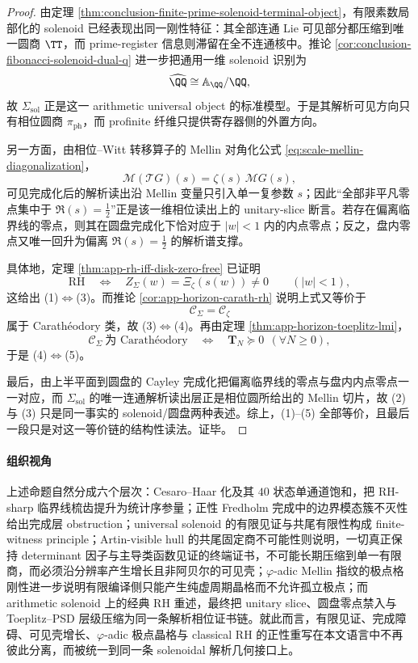 \begin{proof}
由定理 \ref{thm:conclusion-finite-prime-solenoid-terminal-object}，有限素数局部化的 solenoid 已经表现出同一刚性特征：其全部连通 Lie 可见部分都压缩到唯一圆商 \(\TT\)，而 prime-register 信息则滞留在全不连通核中。推论 \ref{cor:conclusion-fibonacci-solenoid-dual-q} 进一步把通用一维 solenoid 识别为
\[
\widehat{\QQ}\cong \mathbb A_{\QQ}/\QQ,
\]
故 \(\Sigma_{\mathrm{sol}}\) 正是这一 arithmetic universal object 的标准模型。于是其解析可见方向只有相位圆商 \(\pi_{\mathrm{ph}}\)，而 profinite 纤维只提供寄存器侧的外置方向。

另一方面，由相位--Witt 转移算子的 Mellin 对角化公式 \eqref{eq:scale-mellin-diagonalization}，
\[
\mathcal M(\mathcal T G)(s)=\zeta(s)\,\mathcal M G(s),
\]
可见完成化后的解析读出沿 Mellin 变量只引入单一复参数 \(s\)；因此“全部非平凡零点集中于 \(\Re(s)=\tfrac12\)”正是该一维相位读出上的 unitary-slice 断言。若存在偏离临界线的零点，则其在圆盘完成化下恰对应于 \(|w|<1\) 内的内点零点；反之，盘内零点又唯一回升为偏离 \(\Re(s)=\tfrac12\) 的解析谱支撑。

具体地，定理 \ref{thm:app-rh-iff-disk-zero-free} 已证明
\[
\mathrm{RH}
\quad\Longleftrightarrow\quad
Z_\Sigma(w)=\Xi_\zeta(s(w))\neq 0
\qquad (|w|<1),
\]
这给出 (1)\(\Leftrightarrow\)(3)。而推论 \ref{cor:app-horizon-carath-rh} 说明上式又等价于
\[
\mathscr C_\Sigma=\mathscr C_\zeta
\]
属于 Carath\'eodory 类，故 (3)\(\Leftrightarrow\)(4)。再由定理 \ref{thm:app-horizon-toeplitz-lmi}，
\[
\mathscr C_\Sigma\ \text{为 Carath\'eodory}
\quad\Longleftrightarrow\quad
\mathbf T_N\succeq 0\ \ (\forall N\ge 0),
\]
于是 (4)\(\Leftrightarrow\)(5)。

最后，由上半平面到圆盘的 Cayley 完成化把偏离临界线的零点与盘内内点零点一一对应，而 \(\Sigma_{\mathrm{sol}}\) 的唯一连通解析读出层正是相位圆所给出的 Mellin 切片，故 (2) 与 (3) 只是同一事实的 solenoid/圆盘两种表述。综上，(1)--(5) 全部等价，且最后一段只是对这一等价链的结构性读法。证毕。
\end{proof}






\paragraph{组织视角}
上述命题自然分成六个层次：Cesaro--Haar 化及其 \(40\) 状态单通道饱和，把 RH-sharp 临界线梳齿提升为统计序参量；正性 Fredholm 完成中的边界模态簇不灭性给出完成层 obstruction；universal solenoid 的有限见证与共尾有限性构成 finite-witness principle；Artin-visible hull 的共尾固定商不可能性则说明，一切真正保持 determinant 因子与主导类函数见证的终端证书，不可能长期压缩到单一有限商，而必须沿分辨率产生增长且非阿贝尔的可见壳；\(\varphi\)-adic Mellin 指纹的极点格刚性进一步说明有限编译侧只能产生纯虚周期晶格而不允许孤立极点；而 arithmetic solenoid 上的经典 RH 重述，最终把 unitary slice、圆盘零点禁入与 Toeplitz--PSD 层级压缩为同一条解析相位证书链。就此而言，有限见证、完成障碍、可见壳增长、\(\varphi\)-adic 极点晶格与 classical RH 的正性重写在本文语言中不再彼此分离，而被统一到同一条 solenoidal 解析几何接口上。

\endinput

